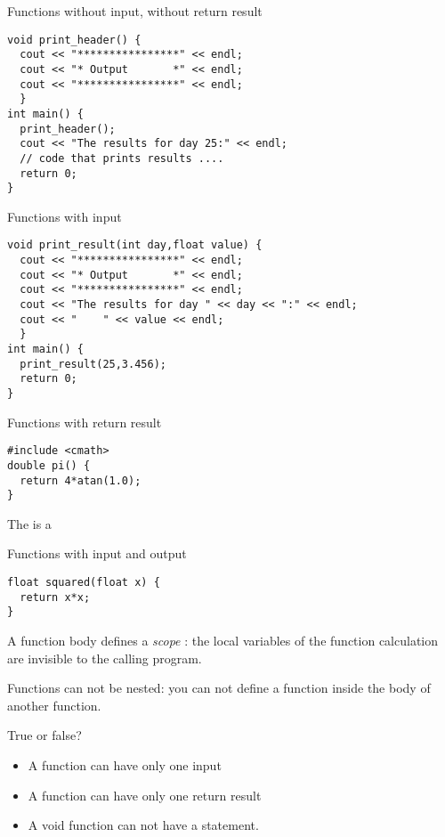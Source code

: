 \begin{block}{Functions without input, without return result}
  \label{sl:func-ex1}
\begin{lstlisting}
void print_header() {
  cout << "****************" << endl;
  cout << "* Output       *" << endl;
  cout << "****************" << endl;
  }
int main() {
  print_header();
  cout << "The results for day 25:" << endl;
  // code that prints results ....
  return 0;
}
\end{lstlisting}
\end{block}

\begin{block}{Functions with input}
  \label{sl:func-ex2}
\begin{lstlisting}
void print_result(int day,float value) {
  cout << "****************" << endl;
  cout << "* Output       *" << endl;
  cout << "****************" << endl;
  cout << "The results for day " << day << ":" << endl;
  cout << "    " << value << endl;
  }
int main() {
  print_result(25,3.456);
  return 0;
}
\end{lstlisting}
\end{block}

\begin{block}{Functions with return result}
  \label{sl:func-return}
\begin{lstlisting}
#include <cmath>
double pi() {
  return 4*atan(1.0);
}
\end{lstlisting}
The  is a 
\end{block}

\begin{block}{Functions with input and output}
  \label{sl:func-param-return}
\begin{lstlisting}
float squared(float x) {
  return x*x;
}
\end{lstlisting}
\end{block}

A function body defines a
%
\emph{scope}%
:
the local variables of the function calculation are invisible to the
calling program.

Functions can not be nested: you can not define a function inside the
body of another function.

\begin{review}
  \label{rev:func-param}
  True or false?
  \begin{itemize}
  \item A function can have only one input
  \item A function can have only one return result
  \item A void function can not have a  statement.
  \end{itemize}
\end{review}

